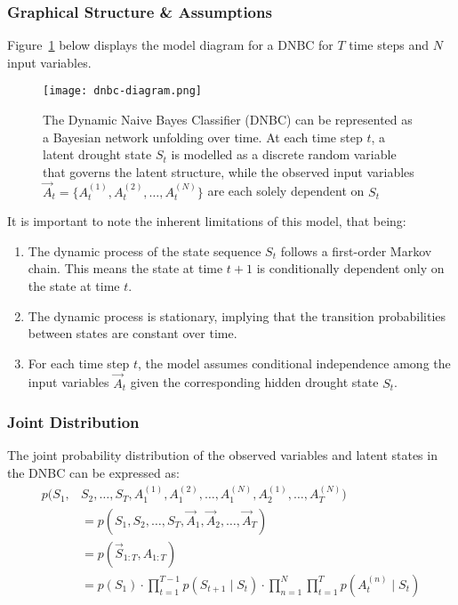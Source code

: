 \subsubsection{Graphical Structure \& Assumptions}

Figure~\ref{fig:dnbc-diagram} below displays the model diagram for a DNBC for $T$ time steps and $N$ input variables.  

\begin{figure}[!h]
    \centering
    \texttt{[image: dnbc-diagram.png]}
    \caption[DNBC Model Diagram]{
The Dynamic Naive Bayes Classifier (DNBC) can be represented as a Bayesian network unfolding over time. At each time step $t$, a latent drought state $S_t$ is modelled as a discrete random variable that governs the latent structure, while the observed input variables $\vec{A}_t = \{A_t^{(1)}, A_t^{(2)}, \dots, A_t^{(N)}\}$ are each solely dependent on $S_t$}
    \label{fig:dnbc-diagram}
\end{figure}

It is important to note the inherent limitations of this model, that being:
\begin{enumerate}[label=(\roman*)]
    \item The dynamic process of the state sequence $S_t$ follows a first-order Markov chain. This means the state at time $t+1$ is conditionally dependent only on the state at time $t$. \label{item:assumption_1}
    \item The dynamic process is stationary, implying that the transition probabilities between states are constant over time. \label{item:assumption_2}
    \item For each time step $t$, the model assumes conditional independence among the input variables $\vec{A}_t$ given the corresponding hidden drought state $S_t$. \label{item:assumption_3}
\end{enumerate}

\subsubsection{Joint Distribution}

The joint probability distribution of the observed variables and latent states in the DNBC can be expressed as:
\begin{equation}
    \begin{align}
        p(S_1, &S_2, \dots, S_T, A^{(1)}_1, A^{(2)}_1, \dots, A^{(N)}_1, A^{(1)}_2, \dots, A^{(N)}_T) \\ 
        &= p(S_1, S_2, \dots, S_T, \vec{A}_1, \vec{A}_2, \dots, \vec{A}_T) \\
        &= p(\vec{S}_{1:T}, A_{1:T}) \\
        &= p(S_1) \cdot \prod\limits_{t=1}^{T-1} p(S_{t+1} \mid S_t) \cdot \prod\limits_{n=1}^{N} \prod\limits_{t=1}^T p(A^{(n)}_t \mid S_t)
    \end{align}
    \label{eqn:joint_distr}
\end{equation}


